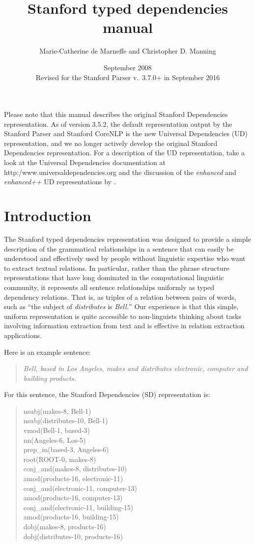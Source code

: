 \documentclass[11pt,letterpaper]{article}
\title{\textbf{Stanford typed dependencies manual}}
\author{Marie-Catherine de Marneffe and Christopher D. Manning}
\date{September 2008\\
Revised for the Stanford Parser v.\ 3.7.0+ in September 2016
}
\begin{document}
\maketitle

\textcolor{cardinal}{Please note that this manual describes the original Stanford
Dependencies representation. As of version 3.5.2, the default representation
output by the Stanford Parser and Stanford CoreNLP is the new Universal Dependencies (UD)
representation, and we no longer actively develop the original Stanford Dependencies representation. For a description of the UD
representation, take a look at the Universal Dependencies documentation at \textsf{http:/www.universaldependencies.org} and
the discussion of the \textit{enhanced} and \textit{enhanced++} UD representations by \citet{schuster2016enhanced}.}

\section{Introduction}

The Stanford typed dependencies representation was designed to provide
a simple description of the grammatical relationships in a sentence
that can easily be understood and effectively used by people without
linguistic expertise who want to extract textual relations.  In
particular, rather than the phrase structure representations that have
long dominated in the computational linguistic community, it
represents all sentence relationships uniformly as typed dependency
relations. That is, as triples of a relation between pairs of words, such as ``the subject of
\emph{distributes} is \emph{Bell.}''  Our experience is that this simple,
uniform representation is quite accessible to non-linguists
thinking about tasks involving information extraction from text and is
effective in relation extraction applications.

Here is an example sentence:
\begin{quote}
\emph{Bell, based in Los Angeles, makes and distributes electronic, computer and building products.}
\end{quote}
For this sentence, the Stanford Dependencies (SD) representation is:
\begin{quote}
nsubj(makes-8, Bell-1) \\
nsubj(distributes-10, Bell-1) \\
vmod(Bell-1, based-3) \\
nn(Angeles-6, Los-5) \\
prep\_in(based-3, Angeles-6) \\
root(ROOT-0, makes-8)\\
conj\_and(makes-8, distributes-10) \\
amod(products-16, electronic-11) \\
conj\_and(electronic-11, computer-13) \\
amod(products-16, computer-13) \\
conj\_and(electronic-11, building-15) \\
amod(products-16, building-15) \\
dobj(makes-8, products-16) \\
dobj(distributes-10, products-16)
\end{quote}
\end{document}
